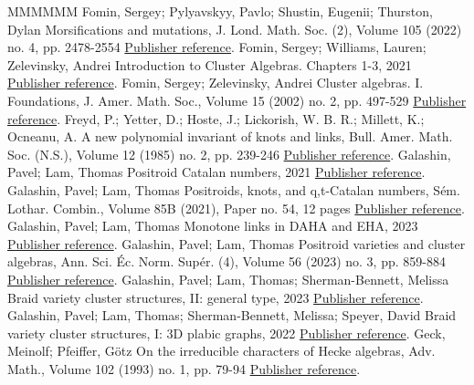 \documentclass[11pt]{article}
\theoremstyle{definition}
\numberwithin{equation}{section}
\begin{document}
\begin{thebibliography}{MMMMMM}
 Fomin, Sergey; Pylyavskyy, Pavlo; Shustin, Eugenii; Thurston, Dylan Morsifications and mutations, J. Lond. Math. Soc. (2), Volume 105 (2022) no. 4, pp. 2478-2554 \href{https://alco.centre-mersenne.org/articles/10.5802/alco.345/#FPST}{Publisher reference}.
 Fomin, Sergey; Williams, Lauren; Zelevinsky, Andrei Introduction to Cluster Algebras. Chapters 1-3, 2021 \href{https://alco.centre-mersenne.org/articles/10.5802/alco.345/#FWZ_book}{Publisher reference}.
 Fomin, Sergey; Zelevinsky, Andrei Cluster algebras. I. Foundations, J. Amer. Math. Soc., Volume 15 (2002) no. 2, pp. 497-529 \href{https://alco.centre-mersenne.org/articles/10.5802/alco.345/#FZ}{Publisher reference}.
 Freyd, P.; Yetter, D.; Hoste, J.; Lickorish, W. B. R.; Millett, K.; Ocneanu, A. A new polynomial invariant of knots and links, Bull. Amer. Math. Soc. (N.S.), Volume 12 (1985) no. 2, pp. 239-246 \href{https://alco.centre-mersenne.org/articles/10.5802/alco.345/#HOMFLY}{Publisher reference}.
 Galashin, Pavel; Lam, Thomas Positroid Catalan numbers, 2021 \href{https://alco.centre-mersenne.org/articles/10.5802/alco.345/#GL_cat_combin}{Publisher reference}.
 Galashin, Pavel; Lam, Thomas Positroids, knots, and q,t-Catalan numbers, Sém. Lothar. Combin., Volume 85B (2021), Paper no. 54, 12 pages \href{https://alco.centre-mersenne.org/articles/10.5802/alco.345/#GL_qtcat}{Publisher reference}.
 Galashin, Pavel; Lam, Thomas Monotone links in DAHA and EHA, 2023 \href{https://alco.centre-mersenne.org/articles/10.5802/alco.345/#GL_EHA}{Publisher reference}.
 Galashin, Pavel; Lam, Thomas Positroid varieties and cluster algebras, Ann. Sci. Éc. Norm. Supér. (4), Volume 56 (2023) no. 3, pp. 859-884 \href{https://alco.centre-mersenne.org/articles/10.5802/alco.345/#GL_cluster}{Publisher reference}.
 Galashin, Pavel; Lam, Thomas; Sherman-Bennett, Melissa Braid variety cluster structures, II: general type, 2023 \href{https://alco.centre-mersenne.org/articles/10.5802/alco.345/#GLSBS2}{Publisher reference}.
 Galashin, Pavel; Lam, Thomas; Sherman-Bennett, Melissa; Speyer, David Braid variety cluster structures, I: 3D plabic graphs, 2022 \href{https://alco.centre-mersenne.org/articles/10.5802/alco.345/#GLSBS1}{Publisher reference}.
 Geck, Meinolf; Pfeiffer, Götz On the irreducible characters of Hecke algebras, Adv. Math., Volume 102 (1993) no. 1, pp. 79-94 \href{https://alco.centre-mersenne.org/articles/10.5802/alco.345/#GePf}{Publisher reference}.

\end{thebibliography}
\end{document}
